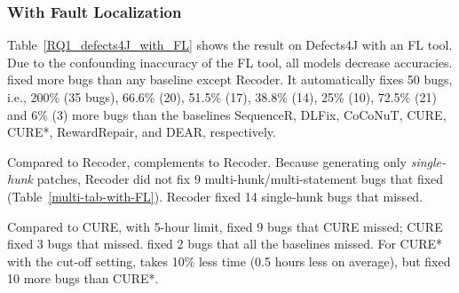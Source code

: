 \subsubsection{{\bf With Fault Localization}}

Table~\ref{RQ1_defects4J_with_FL} shows the result on Defects4J with
an FL tool. Due to the confounding inaccuracy of the FL tool, all
models decrease accuracies. {\tool} fixed more bugs than any baseline
except Recoder. It automatically fixes 50 bugs, i.e., 200\% (35 bugs),
66.6\% (20), 51.5\% (17), 38.8\% (14), 25\% (10), 72.5\% (21) and
6\% (3) more bugs than the baselines SequenceR, DLFix, CoCoNuT, CURE,
CURE*, RewardRepair, and DEAR, respectively.

Compared to Recoder, {\tool} complements to Recoder.  Because
generating only {\em single-hunk} patches, Recoder did not fix 9
multi-hunk/multi-statement bugs that {\tool} fixed
(Table~\ref{multi-tab-with-FL}). Recoder fixed 14 single-hunk bugs that {\tool} missed.

Compared to CURE, with 5-hour limit, {\tool} fixed 9 bugs that CURE
missed; CURE fixed 3 bugs that {\tool} missed. {\tool} fixed
2 bugs that all the baselines missed. For CURE* with the
cut-off setting, {\tool} takes 10\% less time (0.5 hours less on
average), but fixed 10 more bugs than CURE*.




%





